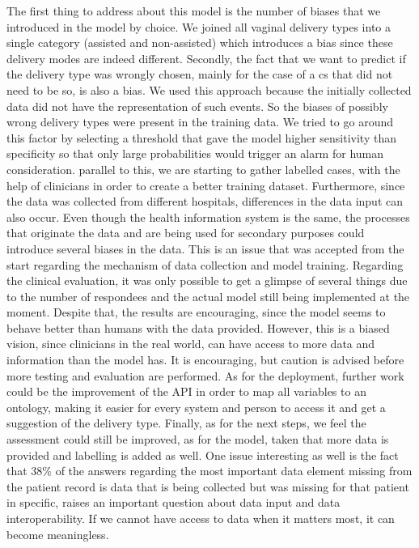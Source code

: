 The first thing to address about this model is the number of biases that we introduced in the model by choice. We joined all vaginal delivery types into a single category (assisted and non-assisted) which introduces a  bias since these delivery modes are indeed different. Secondly, the fact that we want to predict if the delivery type was wrongly chosen, mainly for the case of a \ac{cs} that did not need to be so, is also a bias. We used this approach because the initially collected data did not have the representation of such events. So the biases of possibly wrong delivery types were present in the training data. We tried to go around this factor by selecting a threshold that gave the model higher sensitivity than specificity so that only large probabilities would trigger an alarm for human consideration. parallel to this, we are starting to gather labelled cases, with the help of clinicians in order to create a better training dataset.
Furthermore, since the data was collected from different hospitals,  differences in the data input can also occur. Even though the health information system is the same, the processes that originate the data and are being used for secondary purposes could introduce several biases in the data. This is an issue that was accepted from the start regarding the mechanism of data collection and model training.
Regarding the clinical evaluation, it was only possible to get a glimpse of several things due to the number of respondees and the actual model still being implemented at the moment. Despite that, the results are encouraging, since the model seems to behave better than humans with the data provided. However, this is a biased vision, since clinicians in the real world, can have access to more data and information than the model has. It is encouraging, but caution is advised before more testing and evaluation are performed.
As for the deployment, further work could be the improvement of the API in order to map all variables to an ontology, making it easier for every system and person to access it and get a suggestion of the delivery type.
Finally, as for the next steps, we feel the assessment could still be improved, as for the model, taken that more data is provided and labelling is added as well. One issue interesting as well is the fact that 38\% of the answers regarding the most important data element missing from the patient record is data that is being collected but was missing for that patient in specific, raises an important question about data input and data interoperability. If we cannot have access to data when it matters most, it can become meaningless.


